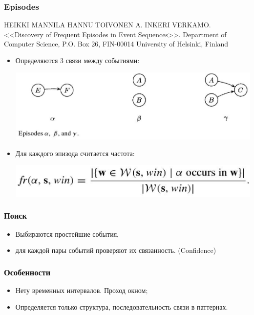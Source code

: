 \documentclass[smaller]{beamer}
\begin{document}
\begin{frame}
  \frametitle{Episodes}
HEIKKI MANNILA
HANNU TOIVONEN
A. INKERI VERKAMO.
  <<Discovery of Frequent Episodes in Event Sequences>>. Department of Computer Science, P.O. Box 26, FIN-00014 University of Helsinki, Finland
  \begin{itemize}
    \item Определяются 3 связи между событиями:
	\begin{center}
	  \includegraphics[scale=0.2]{patEpisodes.eps}
	\end{center}
    \item Для каждого эпизода считается частота: 
	    \begin{center}
	  \includegraphics[scale=0.2]{episodesFormula.eps}
	  \end{center}
  \end{itemize}
\end{frame}

\begin{frame}
  \frametitle{Поиск}
  \begin{itemize}
    \item Выбираются простейшие события,
    \item для каждой пары событий проверяют их связанность. (Confidence)
  \end{itemize}
\end{frame}

\begin{frame}
  \frametitle{Особенности}
  \begin{itemize}
    \item Нету временных интервалов. Проход окном;
    \item Определяется только структура, последовательность связи в паттернах.
  \end{itemize}
\end{frame}
\end{document}
